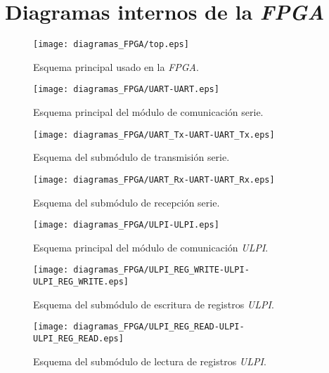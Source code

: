 \chapter{Diagramas internos de la \emph{FPGA}}
\label{ch:diagramas}

\begin{figure}[p]
    \centering
    \texttt{[image: diagramas\_FPGA/top.eps]}
    \caption{Esquema principal usado en la \emph{FPGA}.}
    \label{fig:diagrama_fgpa_top}
\end{figure}

\begin{figure}[p]
    \centering
    \texttt{[image: diagramas\_FPGA/UART-UART.eps]}
    \caption{Esquema principal del módulo de comunicación serie.}
    \label{fig:diagrama_fgpa_uart_main}
\end{figure}

\begin{figure}[p]
    \centering
    \texttt{[image: diagramas\_FPGA/UART\_Tx-UART-UART\_Tx.eps]}
    \caption{Esquema del submódulo de transmisión serie.}
    \label{fig:diagrama_fgpa_uart_tx}
\end{figure}

\begin{figure}[p]
    \centering
    \texttt{[image: diagramas\_FPGA/UART\_Rx-UART-UART\_Rx.eps]}
    \caption{Esquema del submódulo de recepción serie.}
    \label{fig:diagrama_fgpa_uart_rx}
\end{figure}

\begin{figure}[p]
    \centering
    \texttt{[image: diagramas\_FPGA/ULPI-ULPI.eps]}
    \caption{Esquema principal del módulo de comunicación \emph{ULPI}.}
    \label{fig:diagrama_fgpa_ulpi_main}
\end{figure}

\begin{figure}[p]
    \centering
    \texttt{[image: diagramas\_FPGA/ULPI\_REG\_WRITE-ULPI-ULPI\_REG\_WRITE.eps]}
    \caption{Esquema del submódulo de escritura de registros \emph{ULPI}.}
    \label{fig:diagrama_fgpa_ulpi_reg_write}
\end{figure}

\begin{figure}[p]
    \centering
    \texttt{[image: diagramas\_FPGA/ULPI\_REG\_READ-ULPI-ULPI\_REG\_READ.eps]}
    \caption{Esquema del submódulo de lectura de registros \emph{ULPI}.}
    \label{fig:diagrama_fgpa_ulpi_reg_read}
\end{figure}

